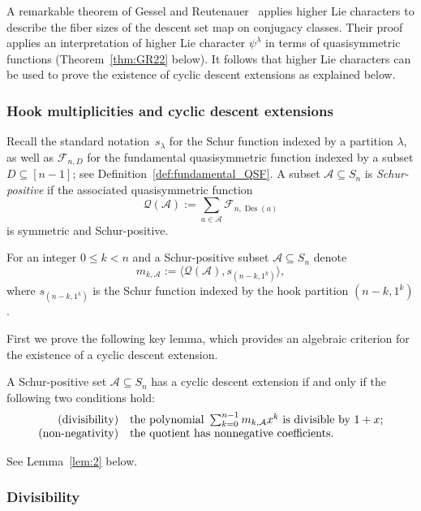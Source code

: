 \documentclass[ALCO,published]{cedram}
\newcommand{\Q}{\mathcal Q}
\newcommand{\f}{\mathcal F}
\newcommand{\A}{\mathcal A}
\DeclareMathOperator\Des{Des}
\begin{document}
A remarkable theorem of  Gessel and Reutenauer~\cite[Theorem 2.1]{GR} 
applies higher Lie characters to describe the fiber sizes of the descent set map on conjugacy classes.  
Their proof applies an interpretation of higher Lie character $\psi^\lambda$ in terms of quasisymmetric functions 
(Theorem~\ref{thm:GR22} below). 
It follows that 
higher Lie characters can be used to prove the existence of cyclic descent extensions 
as explained below. 


\subsubsection{Hook multiplicities and cyclic descent extensions} 

Recall the standard notation~$s_\lambda$ for the Schur function indexed by a partition $\lambda$, 
as well as $\f_{n,D}$ for the fundamental quasisymmetric function indexed by a subset $D\subseteq [n-1]$;
see Definition~\ref{def:fundamental_QSF}.
A subset $\A\subseteq S_n$ is {\em Schur-positive} 
if the
associated quasisymmetric function
\[
\Q(\A):=\sum\limits_{a\in \A}\f_{n,\Des(a)}
\]
is symmetric and Schur-positive.

For an integer $0 \le k<n$ and a Schur-positive subset $\A \subseteq S_n$ denote
\[
m_{k,\A} := \langle \Q(\A), s_{(n-k,1^k)} \rangle,
\]
where $s_{(n-k,1^k)}$ is the Schur function indexed by the hook partition $(n-k,1^k)$.

First we prove the following key lemma, which provides an algebraic criterion for the existence of a cyclic descent extension. 

\begin{lemma}\label{lem:21}
A Schur-positive set $\A\subseteq S_n$ has a cyclic descent extension if and only if 
the following two conditions hold:
\[
\begin{array}{rl}
	\text{\rm (divisibility)}   & 
	\text{the polynomial }
	\sum_{k=0}^{n-1} m_{k,\A} x^k
	\text{ is divisible by } 1+x; \\
	\text{\rm (non-negativity)} & 
	\text{the quotient has nonnegative coefficients.}
\end{array}
\]
\end{lemma}		

See Lemma~\ref{lem:2}  below.


\subsubsection{Divisibility} 
\end{document}
